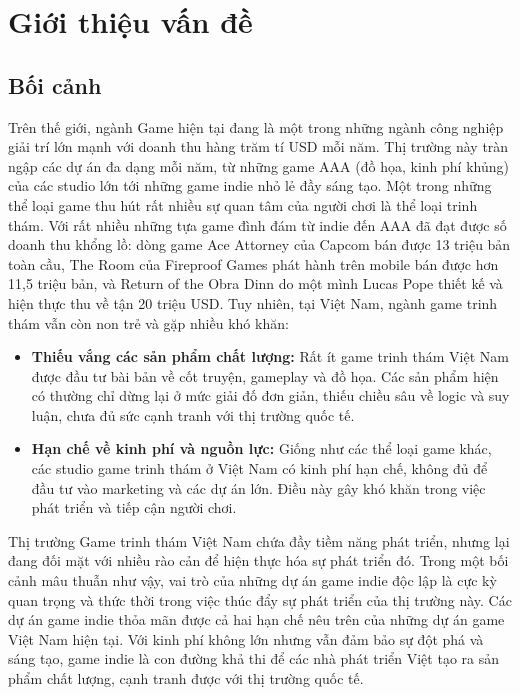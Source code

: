 \section{Giới thiệu vấn đề}
\subsection{Bối cảnh}
Trên thế giới, ngành Game hiện tại đang là một trong những ngành công nghiệp giải trí lớn mạnh với doanh thu hàng trăm tí USD mỗi năm. 
Thị trường này tràn ngập các dự án đa dạng mỗi năm, từ những game AAA (đồ họa, kinh phí khủng) của các studio lớn tới những game indie nhỏ lẻ đầy sáng tạo. Một trong những thể loại game thu hút rất nhiều sự quan tâm của người chơi là thể loại trinh thám. 
Với rất nhiều những tựa game đình đám từ indie đến AAA đã đạt được số doanh thu khổng lồ: dòng game Ace Attorney của Capcom bán được 13 triệu bản toàn cầu, The Room của Fireproof Games phát hành trên mobile bán được
hơn 11,5 triệu bản, và Return of the Obra Dinn do một mình Lucas Pope thiết kế và hiện thực thu về tận 20 triệu USD. 
Tuy nhiên, tại Việt Nam, ngành game trinh thám vẫn còn non trẻ và gặp nhiều khó khăn:
\begin{itemize}
    \item \textbf{Thiếu vắng các sản phẩm chất lượng:} Rất ít game trinh thám Việt Nam được đầu tư bài bản về cốt truyện, gameplay và đồ họa. Các sản phẩm hiện có thường chỉ dừng lại ở mức giải đố đơn giản, thiếu chiều sâu về logic và suy luận, chưa đủ sức cạnh tranh với thị trường quốc tế.
    \item \textbf{Hạn chế về kinh phí và nguồn lực:} Giống như các thể loại game khác, các studio game trinh thám ở Việt Nam có kinh phí hạn chế, không đủ để đầu tư vào marketing và các dự án lớn. Điều này gây khó khăn trong việc phát triển và tiếp cận người chơi.
\end{itemize}

Thị trường Game trinh thám Việt Nam chứa đầy tiềm năng phát triển, nhưng lại đang đối mặt với nhiều rào cản để hiện thực hóa sự phát triển đó. 
Trong một bối cảnh mâu thuẫn như vậy, vai trò của những dự án game indie độc lập là cực kỳ quan trọng và thức thời trong việc thúc đẩy sự phát triển của thị trường này. 
Các dự án game indie thỏa mãn được cả hai hạn chế nêu trên của những dự án game Việt Nam hiện tại. Với kinh phí không lớn nhưng vẫn đảm bảo sự đột phá và sáng tạo, game indie là con đường khả thi để các nhà phát triển Việt tạo ra sản phẩm chất lượng, cạnh tranh được với thị trường quốc tế.

